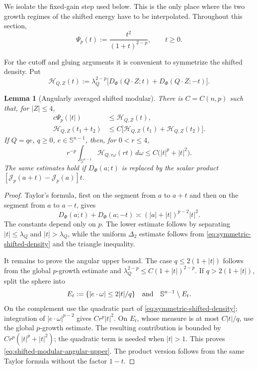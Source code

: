 \documentclass[11pt,reqno]{amsart}
\numberwithin{equation}{section}
\newcommand{\Jp}{\mathcal J_p}
\newcommand{\dd}{\,d}
\newtheorem{lemma}[theorem]{Lemma}
\theoremstyle{remark}
\begin{document}
We isolate the fixed-gain step used below.  This is the only place where
the two growth regimes of the shifted energy have to be interpolated.
Throughout this section,
\begin{equation*}
 \Psi_p(t):=\frac{t^2}{(1+t)^{2-p}},\qquad t\ge0.
\end{equation*}

For the cutoff and gluing arguments it is convenient to symmetrize the
shifted density.  Put
\[
 \mathcal H_{Q,Z}(t):=\lambda_Q^{2-p}
 \bigl[D_\Phi(Q\cdot Z;t)+D_\Phi(Q\cdot Z;-t)\bigr].
\]

\begin{lemma}[Angularly averaged shifted modular]
\label{lem:angularly-averaged-shifted-modular}
There is \(C=C(n,p)\) such that, for \(|Z|\le4\),
\begin{align}
 c\Psi_p(|t|)&\le \mathcal H_{Q,Z}(t),
 \label{eq:shifted-modular-lower}\\
 \mathcal H_{Q,Z}(t_1+t_2)
 &\le C\bigl[\mathcal H_{Q,Z}(t_1)
              +\mathcal H_{Q,Z}(t_2)\bigr].
 \label{eq:shifted-modular-delta-two}
\end{align}
If \(Q=qe\), \(q\ge0\), \(e\in\mathbb S^{n-1}\), then, for
\(0<r\le4\),
\begin{equation}
 r^{-p}\int_{\mathbb S^{n-1}}
 \mathcal H_{Q,r\omega}(rt)\dd\omega
 \le C\bigl(|t|^p+|t|^2\bigr).
 \label{eq:shifted-modular-angular-upper}
\end{equation}
The same estimates hold if \(D_\Phi(a;t)\) is replaced by the scalar
product
\([\Jp(a+t)-\Jp(a)]t\).
\end{lemma}

\begin{proof}
Taylor's formula, first on the segment from \(a\) to \(a+t\) and then
on the segment from \(a\) to \(a-t\), gives
\begin{equation}
 D_\Phi(a;t)+D_\Phi(a;-t)
 \asymp (|a|+|t|)^{p-2}|t|^2.
 \label{eq:symmetric-shifted-density}
\end{equation}
The constants depend only on \(p\).  The lower estimate follows by
separating \(|t|\le\lambda_Q\) and \(|t|>\lambda_Q\), while the
uniform \(\Delta_2\) estimate follows from
\eqref{eq:symmetric-shifted-density} and the triangle inequality.

It remains to prove the angular upper bound.  The case \(q\le2(1+|t|)\)
follows from the global \(p\)-growth estimate and
\(\lambda_Q^{2-p}\le C(1+|t|)^{2-p}\).  If
\(q>2(1+|t|)\), split the sphere into
\[
 E_t:=\{|e\cdot\omega|\le2|t|/q\}
 \quad\hbox{and}\quad \mathbb S^{n-1}\setminus E_t.
\]
On the complement use the quadratic part of
\eqref{eq:symmetric-shifted-density}; integration of
\(|e\cdot\omega|^{p-2}\) gives \(Cr^p|t|^2\).  On \(E_t\), whose
measure is at most \(C|t|/q\), use the global \(p\)-growth estimate.
The resulting contribution is bounded by
\(Cr^p(|t|^p+|t|^2)\); the quadratic term is needed when \(|t|>1\).
This proves
\eqref{eq:shifted-modular-angular-upper}.  The product version follows
from the same Taylor formula without the factor \(1-t\).
\end{proof}
\end{document}
